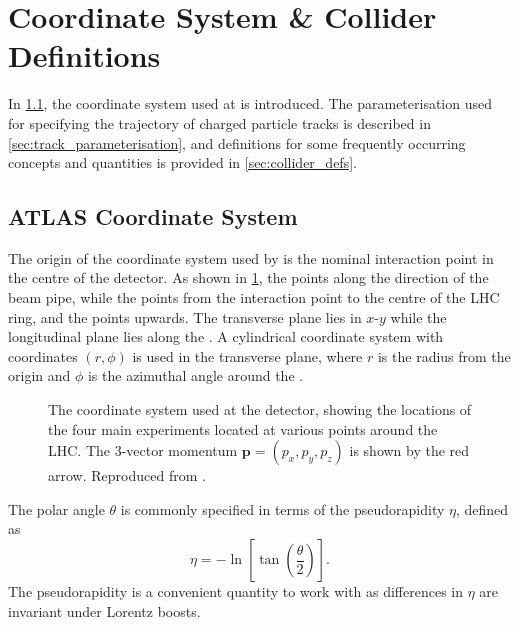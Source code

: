 \section{Coordinate System \& Collider Definitions}\label{sec:atlas_coords}

In \cref{sec:coord_sys}, the coordinate system used at \ATLAS is introduced.
The parameterisation used for specifying the trajectory of charged particle tracks is described in \cref{sec:track_parameterisation}, and definitions for some frequently occurring concepts and quantities is provided in \cref{sec:collider_defs}.

\subsection{ATLAS Coordinate System}\label{sec:coord_sys}


The origin of the coordinate system used by \ATLAS is the nominal interaction point in the centre of the detector.
As shown in \cref{fig:atlas_coord_system}, the  points along the direction of the beam pipe, while the  points from the interaction point to the centre of the LHC ring, and the  points upwards.
The transverse plane lies in $x$\nobreakdash-$y$ while the longitudinal plane lies along the .
A cylindrical coordinate system with coordinates $(r,\phi)$ is used in the transverse plane, where $r$ is the radius from the origin and $\phi$ is the azimuthal angle around the .

\begin{figure}[!htbp]
  \centering
  
  \caption{
    The coordinate system used at the \ATLAS detector, showing the locations of the four main experiments located at various points around the LHC.
    The 3-vector momentum $\bm{p} = (p_x, p_y, p_z)$ is shown by the red arrow.
    Reproduced from .
  }
  \label{fig:atlas_coord_system}
\end{figure}



The polar angle $\theta$ is commonly specified in terms of the pseudorapidity $\eta$, defined as
%
\begin{equation}\label{eq:pseudorap}
  \eta = - \ln \left[ \tan \left( \frac{\theta}{2} \right) \right] .
\end{equation}
%
The pseudorapidity is a convenient quantity to work with as differences in $\eta$ are invariant under Lorentz boosts.

